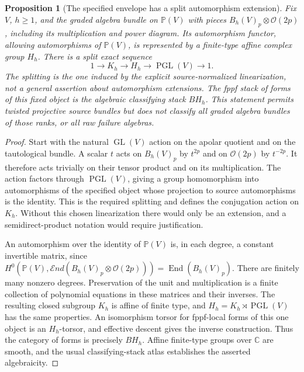 \documentclass[11pt,reqno]{amsart}
\numberwithin{equation}{section}
\newtheorem{proposition}[theorem]{Proposition}
\theoremstyle{definition}\newtheorem{definition}[theorem]{Definition}
\theoremstyle{remark}\newtheorem{remark}[theorem]{Remark}
\newcommand{\C}{\mathbb C}\newcommand{\Q}{\mathbb Q}
\newcommand{\Pj}{\mathbb P}\newcommand{\A}{\mathbb A}
\newcommand{\OO}{\mathcal O}\newcommand{\II}{\mathcal I}
\begin{document}
\begin{proposition}[The specified envelope has a split automorphism extension]
\label{prop:linearized-envelope-v163}
Fix $V$, $h\geq1$, and the graded algebra bundle on $\Pj(V)$ with
pieces $B_h(V)_p\otimes\OO(2p)$, including its multiplication and
power diagram. Its automorphism functor, allowing automorphisms of
$\Pj(V)$, is represented by a finite-type affine complex group $H_h$.
There is a split exact sequence
\[
 1\longrightarrow K_h\longrightarrow H_h\longrightarrow
                          \operatorname{PGL}(V)\longrightarrow1.
\]
The splitting is the one induced by the explicit source-normalized
linearization, not a general assertion about automorphism extensions.
The fppf stack of forms of this fixed object is the algebraic
classifying stack $BH_h$. This statement permits twisted projective
source bundles but does not classify all graded algebra bundles
of those ranks, or all raw failure algebras.
\end{proposition}
\begin{proof}
Start with the natural $\operatorname{GL}(V)$ action on the apolar
quotient and on the tautological bundle. A scalar $t$ acts on
$B_h(V)_p$ by $t^{2p}$ and on $\OO(2p)$ by $t^{-2p}$. It therefore
acts trivially on their tensor product and on its multiplication.
The action factors through $\operatorname{PGL}(V)$, giving a group
homomorphism into automorphisms of the specified object whose
projection to source automorphisms is the identity. This is the
required splitting and defines the conjugation action on $K_h$.
Without this chosen linearization there would only be an extension,
and a semidirect-product notation would require justification.

An automorphism over the identity of $\Pj(V)$ is, in each degree,
a constant invertible matrix, since
$H^0(\Pj(V),\mathcal End(B_h(V)_p\otimes\OO(2p)))
=\operatorname{End}(B_h(V)_p)$. There are finitely many nonzero
degrees. Preservation of the unit and multiplication is a finite
collection of polynomial equations in these matrices and their
inverses. The resulting closed subgroup $K_h$ is affine of finite
type, and $H_h=K_h\rtimes\operatorname{PGL}(V)$ has the same
properties. An isomorphism torsor for fppf-local forms of this one
object is an $H_h$-torsor, and effective descent gives the inverse
construction. Thus the category of forms is precisely $BH_h$.
Affine finite-type groups over $\C$ are smooth, and the usual
classifying-stack atlas establishes the asserted algebraicity.
\end{proof}
\end{document}
